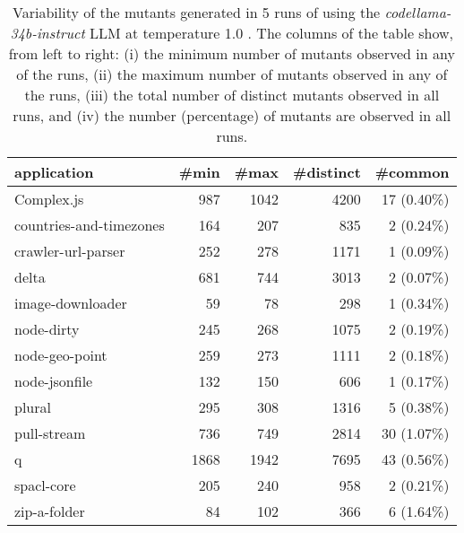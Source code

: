
\begin{table}[hbt!]
\centering
{\footnotesize
\begin{tabular}{l|r|r|r|r}

{\bf application}  & {\bf \#min} &  {\bf \#max} &  {\bf \#distinct} & {\bf \#common}\\
\hline
Complex.js & 987 & 1042 & 4200 & 17 (0.40\%) \\ 
countries-and-timezones & 164 & 207 & 835 & 2 (0.24\%) \\ 
crawler-url-parser & 252 & 278 & 1171 & 1 (0.09\%) \\ 
delta & 681 & 744 & 3013 & 2 (0.07\%) \\ 
image-downloader & 59 & 78 & 298 & 1 (0.34\%) \\ 
node-dirty & 245 & 268 & 1075 & 2 (0.19\%) \\ 
node-geo-point & 259 & 273 & 1111 & 2 (0.18\%) \\ 
node-jsonfile & 132 & 150 & 606 & 1 (0.17\%) \\ 
plural & 295 & 308 & 1316 & 5 (0.38\%) \\ 
pull-stream & 736 & 749 & 2814 & 30 (1.07\%) \\ 
q & 1868 & 1942 & 7695 & 43 (0.56\%) \\ 
spacl-core & 205 & 240 & 958 & 2 (0.21\%) \\ 
zip-a-folder & 84 & 102 & 366 & 6 (1.64\%) \\ 
\end{tabular}
}
\caption{
  Variability of the mutants generated in 5 runs of \ToolName using the \textit{codellama-34b-instruct} LLM
       at temperature 1.0 . The columns of the table show, from left to right:
    (i) the minimum number of mutants observed in any of the runs,
    (ii) the maximum number of mutants observed in any of the runs,
    (iii) the total number of distinct mutants observed in all runs, and
    (iv) the number (percentage) of mutants are observed in all runs.
}
\label{table:Variability_codellama-34b-instruct_1.0}
\end{table}